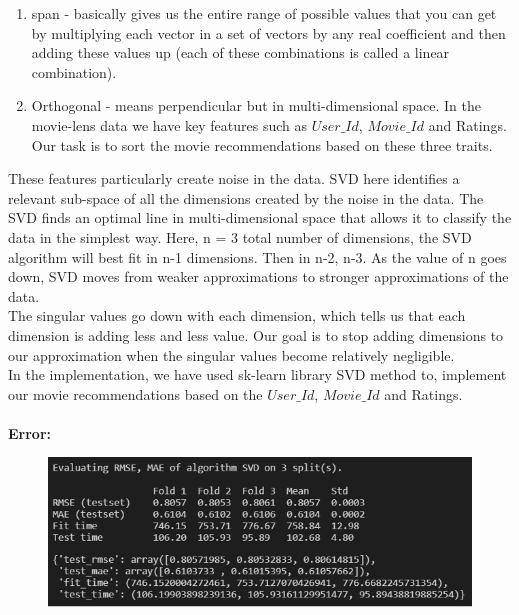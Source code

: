 \documentclass[10pt,conference]{IEEEtran}
\begin{document}
\begin{itemize}
\begin{enumerate}
 \item span - basically gives us the entire range of possible values that you can get by multiplying each vector in a set of vectors by any real coefficient and then adding these values up (each of these combinations is called a linear combination).
 \item Orthogonal - means perpendicular but in multi-dimensional space. In the  movie-lens data we have key features such as ${User\_Id}$, ${Movie\_Id}$ and Ratings. Our task is to sort the movie recommendations based on these three traits.
\end{enumerate}
These features particularly create noise in the data. SVD here identifies a relevant sub-space of all the dimensions created by the noise in the data. The SVD finds an optimal line in multi-dimensional space that allows it to classify the data in the simplest way. Here, n = 3 total number of dimensions, the SVD algorithm will best fit in n-1 dimensions. Then in n-2, n-3. As the value of n goes down, SVD moves from weaker approximations to stronger approximations of the data.\\
The singular values go down with each dimension, which tells us that each dimension is adding less and less value. Our goal is to stop adding dimensions to our approximation when the singular values become relatively negligible.\\
In the implementation, we have used sk-learn library SVD method to, implement our movie recommendations based on the ${User\_Id}$, ${Movie\_Id}$ and Ratings. \\\\
\textbf{Error:}
\begin{figure}[H]
\centering
\includegraphics[scale=.5]{error.png}
\label{fig:error}
\end{figure}


\end{itemize}
\end{document}
